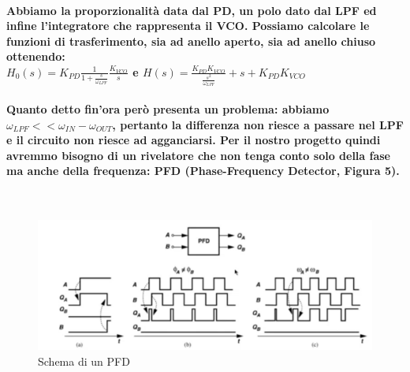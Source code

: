 \documentclass[a4paper]{article}
\begin{document}
\paragraph{Abbiamo la proporzionalità data dal PD, un polo dato dal LPF ed infine l'integratore che rappresenta il VCO. Possiamo calcolare le funzioni di trasferimento, sia ad anello aperto, sia ad anello chiuso ottenendo:\\$H_{0}(s)=K_{PD}\frac{1}{1+\frac{s}{\omega _{LPF}}}\frac{K_{VCO}}{s}$   e   $H(s)=\frac{K_{PD}K_{VCO}}{\frac{s^{2}}{\omega_{LPF}}}+s+K_{PD}K_{VCO}$}
\paragraph{Quanto detto fin'ora però presenta un problema: abbiamo\\ $\omega_{LPF}<<\omega_{IN}-\omega_{OUT}$, pertanto la differenza non riesce a passare nel LPF e il circuito non riesce ad agganciarsi. Per il nostro progetto quindi avremmo bisogno di un rivelatore che non tenga conto solo della fase ma anche della frequenza: PFD (Phase-Frequency Detector, Figura 5).}
~\begin{figure}[H]%
\includegraphics[scale=0.4]{PFD2.png} 
\centering
\caption{Schema di un PFD}
\label{fig:foo}
\end{figure}
\end{document}
